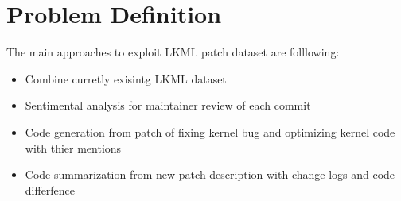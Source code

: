 \section{Problem Definition}
The main approaches to exploit LKML patch dataset are folllowing:
\begin{itemize}
\item Combine curretly exisintg LKML dataset ~\cite{miasoedov2017lkmlarchive,
	xu2018kernelpatchwork}
\item Sentimental analysis for maintainer review of each commit
\item Code generation from patch of fixing kernel bug and optimizing kernel code with
	thier mentions
\item Code summarization from new patch description with change logs and code
	differfence
\end{itemize}
